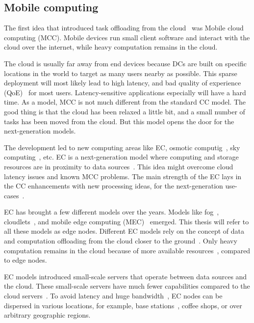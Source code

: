 \subsection{Mobile computing}\label{sec:mobile_computing}
%
The first idea that introduced task offloading from the cloud~\cite{FernandoLR13, LinLJL19} was Mobile cloud computing (MCC). Mobile devices run small client software and interact with the cloud over the internet, while heavy computation remains in the cloud. 

The cloud is usually far away from end devices because DCs are built on specific locations in the world to target as many users nearby as possible. This sparse deployment will most likely lead to high latency, and bad quality of experience (QoE)~\cite{LinLJL19} for most users. Latency-sensitive applications especially will have a hard time. As a model, MCC is not much different from the standard CC model. The good thing is that the cloud has been relaxed a little bit, and a small number of tasks has been moved from the cloud. But this model opens the door for the next-generation models.

The development led to new computing areas like EC, osmotic computig~\cite{VillariFDRJR19, VillariCF17}, sky computing~\cite{StoicaS21}, etc. EC is a next-generation model where computing and storage resources are in proximity to data sources~\cite{Satyanarayanan17}. This idea might overcome cloud latency issues and known MCC problems. The main strength of the EC lays in the CC enhancements with new processing ideas, for the next-generation use-cases~\cite{NingLSY20}. 

EC has brought a few different models over the years. Models like fog~\cite{BonomiMNZ14}, cloudlets~\cite{MonsalveCC18}, and mobile edge computing (MEC)~\cite{WangZZWYW17} emerged. This thesis will refer to all these models as edge nodes. Different EC models rely on the concept of data and computation offloading from the cloud closer to the ground~\cite{KhuneP19}. Only heavy computation remains in the cloud because of more available resources~\cite{NingLSY20}, compared to edge nodes. 

EC models introduced small-scale servers that operate between data sources and the cloud. These small-scale servers have much fewer capabilities compared to the cloud servers~\cite{ChenHLLW15}. To avoid latency and huge bandwidth~\cite{MonsalveCC18}, EC nodes can be dispersed in various locations, for example, base stations~\cite{WangZZWYW17}, coffee shops, or over arbitrary geographic regions.
%
%
